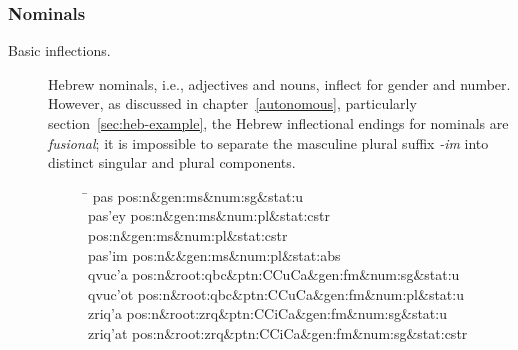 \subsubsection{Nominals}
\begin{description}
\item[Basic inflections.] Hebrew nominals, i.e., adjectives and nouns, 
inflect for gender and number. However, as discussed in chapter~\ref{autonomous}, 
particularly section~\ref{sec:heb-example}, the Hebrew inflectional endings 
for nominals are \emph{fusional}; it is impossible to separate the  masculine plural suffix \textit{-im} into 
distinct singular and plural components.

\begin{figure}[t]\label{fig:blc-nouns}
\begin{mdframed}
\begin{tabbing}
\hspace{1in} \= \hspace{5.5in} \kill
pas \> pos:n\&gen:ms\&num:sg\&stat:u\\
pas\a'{e}y \> pos:n\&gen:ms\&num:pl\&stat:cstr pos:n\&gen:ms\&num:pl\&stat:cstr\\
pas\a'{i}m \> pos:n\&\&gen:ms\&num:pl\&stat:abs\\
qvuc\a'{a} \> pos:n\&root:qbc\&ptn:CCuCa\&gen:fm\&num:sg\&stat:u\\
qvuc\a'{o}t \> pos:n\&root:qbc\&ptn:CCuCa\&gen:fm\&num:pl\&stat:u \\
zriq\a'{a} \> pos:n\&root:zrq\&ptn:CCiCa\&gen:fm\&num:sg\&stat:u \\
zriq\a'{a}t	 \> pos:n\&root:zrq\&ptn:CCiCa\&gen:fm\&num:sg\&stat:cstr \\

\end{tabbing}
\end{mdframed}
\end{figure}
\end{description}
